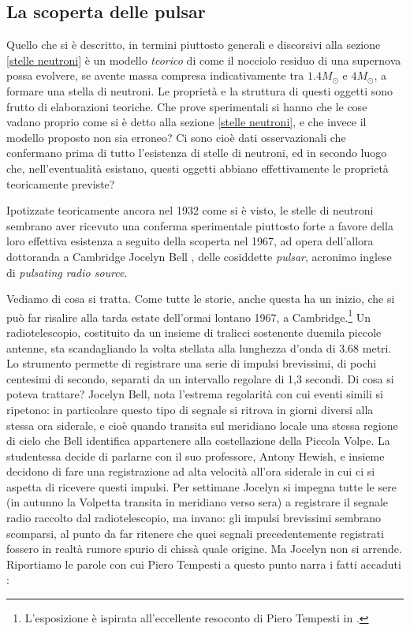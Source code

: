 \subsection{La scoperta delle pulsar}\label{scoperta pulsar}
Quello che si è descritto, in termini piuttosto generali e discorsivi alla sezione \ref{stelle neutroni} è un modello \emph{teorico} di come il nocciolo residuo di una supernova possa evolvere, se avente massa compresa indicativamente tra $1.4 M_{\odot}$ e $4M_{\odot}$, a formare una stella di neutroni. Le propriet\`{a} e la struttura di questi oggetti sono frutto di elaborazioni teoriche. Che prove sperimentali si hanno che le cose vadano proprio come si è detto alla sezione \ref{stelle neutroni}, e che invece il modello proposto non sia erroneo? Ci sono cioè dati osservazionali che confermano prima di tutto l'esistenza di stelle di neutroni, ed in secondo luogo che, nell'eventualit\`{a} esistano, questi oggetti abbiano effettivamente le propriet\`{a} teoricamente previste?
\par
Ipotizzate teoricamente ancora nel 1932 come si è visto, le stelle di neutroni sembrano aver ricevuto una conferma sperimentale piuttosto forte a favore della loro effettiva esistenza a seguito della scoperta nel 1967, ad opera dell'allora dottoranda a  Cambridge Jocelyn Bell , delle cosiddette \emph{pulsar}, acronimo inglese di \emph{pulsating radio source}.
\par
Vediamo di cosa si tratta. Come tutte le storie, anche questa ha un inizio, che si può far risalire alla tarda estate dell'ormai lontano 1967, a Cambridge.\footnote{L'esposizione è ispirata all'eccellente resoconto di Piero Tempesti in \Cite{tempesti}.} Un radiotelescopio, costituito da un insieme di tralicci sostenente duemila piccole antenne, sta scandagliando la volta stellata alla lunghezza d'onda di 3.68 metri. Lo strumento permette di registrare una serie di impulsi brevissimi, di pochi centesimi di secondo, separati da un intervallo regolare di 1,3 secondi. Di cosa si poteva trattare? Jocelyn Bell, nota l'estrema regolarit\`{a} con cui eventi simili si ripetono: in particolare questo tipo di segnale si ritrova in giorni diversi alla stessa ora siderale, e cioè quando transita sul meridiano locale una stessa regione di cielo che Bell identifica appartenere alla costellazione della Piccola Volpe. La studentessa decide di parlarne con il suo professore, Antony Hewish, e insieme decidono di fare una registrazione ad alta velocit\`{a} all'ora siderale in cui ci si aspetta di ricevere questi impulsi. Per settimane Jocelyn si impegna tutte le sere (in autunno la Volpetta transita in meridiano verso sera) a registrare il segnale radio raccolto dal radiotelescopio, ma invano: gli impulsi brevissimi sembrano scomparsi, al punto da far ritenere che quei segnali precedentemente registrati fossero in realt\`{a} rumore spurio di chiss\`{a} quale origine. Ma Jocelyn non si arrende. Riportiamo le parole con cui Piero Tempesti a questo punto narra i fatti accaduti \Cite{tempesti}:
